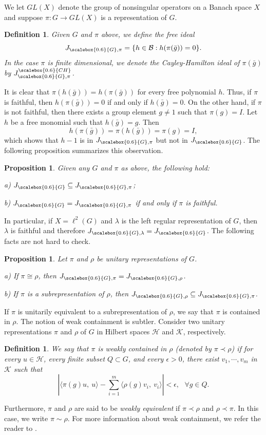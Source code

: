 \documentclass[draft, 12pt, reqno]{amsart}
\newcommand{\B}{{\mathcal B}}
\newcommand{\lb}{{\lambda}}
\numberwithin{equation}{section}
\theoremstyle{plain}
\newtheorem{proposition}[theorem]{Proposition}
\newtheorem{definition}[theorem]{Definition}
\begin{document}
We let $GL(X)$ denote the group of nonsingular operators on a Banach space $X$ and suppose $\pi: G\to GL(X)$ is a representation of $G$.
\begin{definition}
Given $G$ and $\pi$ above, we define the free ideal \[J_{\scalebox{0.6}{G},\pi}=\{h\in \B: h(\pi(\bar{g}))=0\}.\] 
In the case $\pi$ is finite dimensional, we denote the Cayley-Hamilton ideal of $\pi(\bar{g})$ by $J_{\scalebox{0.6}{G},\pi}^{\scalebox{0.6}{CH}}$.
\end{definition}
It is clear that $\pi (h(\bar{g}))=h(\pi(\bar{g}))$ for every free polynomial $h$. Thus, if $\pi$ is faithful, then $h(\pi(\bar{g}))=0$ if and only if $h(\bar{g})=0$. On the other hand, if $\pi$ is not faithful, then there exists a group element $g\neq 1$ such that $\pi(g)=I$.  Let $h$ be a free monomial such that $h(\bar{g})=g$. Then 
\[h(\pi(\bar{g}))=\pi(h(\bar{g}))=\pi (g)=I,\]which shows that $h-1$ is in $J_{\scalebox{0.6}{G},\pi}$ but not in $J_{\scalebox{0.6}{G}}$. The following proposition summarizes this observation.
\begin{proposition}
Given any $G$ and $\pi$ as above, the following hold:

a) $J_{\scalebox{0.6}{G}}\subseteq J_{\scalebox{0.6}{G},\pi}$;

b) $J_{\scalebox{0.6}{G}}=J_{\scalebox{0.6}{G},\pi}$ if and only if $\pi$ is faithful.
\end{proposition}
\noindent In particular, if $X=\ell^2(G)$ and $\lambda$ is the left regular representation of $G$, then $\lb$ is faithful and therefore $J_{\scalebox{0.6}{G},\lb}=J_{\scalebox{0.6}{G}}$. The following facts are not hard to check.
\begin{proposition}
Let  $\pi$ and $\rho$ be unitary representations of $G$.

a) If $\pi\cong \rho$, then $J_{\scalebox{0.6}{G},\pi}=J_{\scalebox{0.6}{G},\rho}$.

b) If $\pi$ is a subrepresentation of $\rho$, then $J_{\scalebox{0.6}{G},\rho}\subseteq J_{\scalebox{0.6}{G},\pi}$.
\end{proposition}

If $\pi$ is unitarily equivalent to a subrepresentation of $\rho$, we say that $\pi$ is contained in $\rho$. The notion of weak containment is subtler. Consider two unitary representations $\pi$ and $\rho$ of $G$ in Hilbert spaces ${\mathcal H}$ and ${\mathcal K}$, respectively.

\begin{definition} We say that $\pi$ is weakly contained in $\rho$ (denoted by $\pi\prec \rho$) if for every $u\in {\mathcal H}$, every finite subset $Q\subset G$, and every $\epsilon>0$, there exist $v_1, \cdots, v_m$ in ${\mathcal K}$ such that 
\[|\langle \pi(g)u,\ u\rangle-\sum_{i=1}^{m}\langle \rho(g)v_i,\ v_i\rangle|<\epsilon,\ \ \ \forall g\in Q.\]
\end{definition}
\noindent Furthermore, $\pi$ and $\rho$ are said to be {\em weakly equivalent} if $\pi\prec \rho$ and $\rho\prec \pi$. In this case, we write $\pi\sim \rho$. For more information about weak containment, we refer the reader to \cite{BHV,Ya24}.
\end{document}
